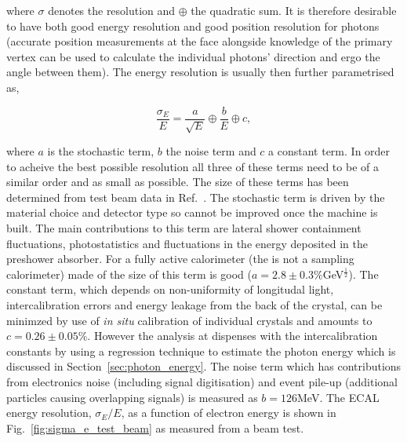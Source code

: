 where $\sigma$ denotes the resolution and $\oplus$ the quadratic sum. It is therefore desirable to have both good energy resolution and good position resolution for photons (accurate position measurements at the \ECAL face alongside knowledge of the primary vertex can be used to calculate the individual photons' direction and ergo the angle between them). The energy resolution is usually then further parametrised as,

\begin{equation}
  \frac{\sigma_{E}}{E} = \frac{a}{\sqrt{E}} \oplus \frac{b}{E} \oplus c,
  \label{eq:energy_res}
\end{equation}

where $a$ is the stochastic term, $b$ the noise term and $c$ a constant term. In order to acheive the best possible resolution all three of these terms need to be of a similar order and as small as possible. The size of these terms has been determined from test beam data in Ref.~\cite{CMS_JINST}. The stochastic term is driven by the material choice and detector type so cannot be improved once the machine is built. The main contributions to this term are lateral shower containment fluctuations, photostatistics and fluctuations in the energy deposited in the preshower absorber. For a fully active calorimeter (the \CMS \ECAL is not a sampling calorimeter) made of \PbWO the size of this term is good ($a=2.8\pm0.3\% $GeV$^{\frac{1}{2}}$). The constant term, which depends on non-uniformity of longitudal light, intercalibration errors and energy leakage from the back of the crystal, can be minimzed by use of \emph{in situ} calibration of individual crystals and amounts to $c=0.26\pm0.05\%$. However the \Hgg analysis at \CMS dispenses with the intercalibration constants by using a regression technique to estimate the photon energy which is discussed in Section~\ref{sec:photon_energy}. The noise term which has contributions from electronics noise (including signal digitisation) and event pile-up (additional particles causing overlapping signals) is measured as $b=126$MeV. The ECAL energy resolution, $\sigma_{E}/E$, as a function of electron energy is shown in Fig.~\ref{fig:sigma_e_test_beam} as measured from a beam test. 

